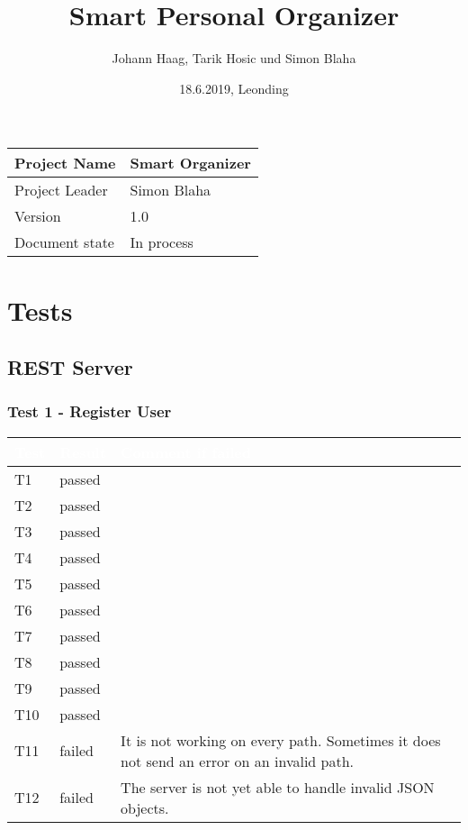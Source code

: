 \documentclass[12pt]{scrartcl}
\title{Smart Personal Organizer}
\author{Johann Haag, Tarik Hosic und Simon Blaha}
\date{18.6.2019, Leonding}
\begin{document}
    \maketitle
    \begin{flushleft}
    \begin{tabular}{|l|l|}
    \hline
    Project Name & Smart Organizer \\ \hline
    Project Leader & Simon Blaha \\ \hline
    Version & 1.0\\ \hline
    Document state & In process \\ \hline
    \end{tabular}
    \end{flushleft}

    \pagebreak
    \tableofcontents
    \pagebreak


    \section{Tests}                             
    \subsection{REST Server}
    \subsubsection{Test 1 - Register User}
        \begin{tabular}{|L{2cm}|L{1.2cm}|L{11cm}|} 
            \hline 
            \textcolor{white}{Test} & \textcolor{white}{Result} & \textcolor{white}{Comment if failed} \\ \hline
            T1 &  passed & \\  \hline
            T2 &  passed & \\  \hline
            T3 &  passed & \\  \hline
            T4 &  passed & \\  \hline
            T5 &  passed & \\  \hline
            T6 &  passed & \\  \hline
            T7 &  passed & \\  \hline
            T8 &  passed & \\  \hline
            T9 &  passed & \\  \hline
            T10 & passed & \\  \hline
            T11 & failed & It is not working on every path. Sometimes it does not send an error on an invalid path.\\  \hline
            T12 & failed & The server is not yet able to handle invalid JSON objects.\\  \hline
        \end{tabular}
\end{document}
